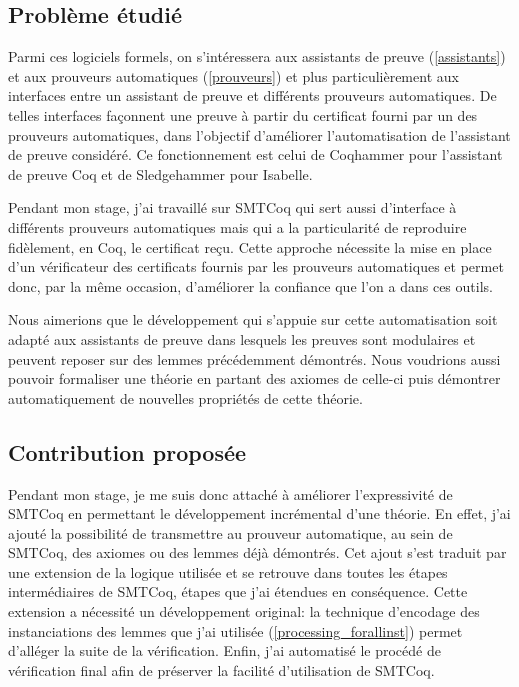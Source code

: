\documentclass[11pt]{article}
\begin{document}
\subsection{Problème étudié}

Parmi ces logiciels formels, on s'intéressera aux assistants de preuve (\ref{assistants}) et aux prouveurs automatiques (\ref{prouveurs}) et plus particulièrement aux interfaces entre un assistant de preuve et différents prouveurs automatiques. De telles interfaces façonnent une preuve à partir du certificat fourni par un des prouveurs automatiques, dans l'objectif d'améliorer l'automatisation de l'assistant de preuve considéré. Ce fonctionnement est celui de Coqhammer \cite{coqhammer} pour l'assistant de preuve Coq et de Sledgehammer \cite{sledgehammer_manual} pour Isabelle. \medbreak

Pendant mon stage, j'ai travaillé sur SMTCoq \cite{smtcoq_code, these_keller} qui sert aussi d'interface à différents prouveurs automatiques mais qui a la particularité de reproduire fidèlement, en Coq, le certificat reçu. Cette approche nécessite la mise en place d'un vérificateur des certificats fournis par les prouveurs automatiques et permet donc, par la même occasion, d'améliorer la confiance que l'on a dans ces outils.\medbreak

Nous aimerions que le développement qui s'appuie sur cette automatisation soit adapté aux assistants de preuve dans lesquels les preuves sont modulaires et peuvent reposer sur des lemmes précédemment démontrés. Nous voudrions aussi pouvoir formaliser une théorie en partant des axiomes de celle-ci puis démontrer automatiquement de nouvelles propriétés de cette théorie.

\subsection{Contribution proposée}

Pendant mon stage, je me suis donc attaché à améliorer l'expressivité de SMTCoq en permettant le développement incrémental d'une théorie. En effet, j'ai ajouté la possibilité de transmettre au prouveur automatique, au sein de SMTCoq, des axiomes ou des lemmes déjà démontrés. Cet ajout s'est traduit par une extension de la logique utilisée et se retrouve dans toutes les étapes intermédiaires de SMTCoq, étapes que j'ai étendues en conséquence. Cette extension a nécessité un développement original: la technique d'encodage des instanciations des lemmes que j'ai utilisée (\ref{processing_forallinst}) permet d'alléger la suite de la vérification. Enfin, j'ai automatisé le procédé de vérification final afin de préserver la facilité d'utilisation de SMTCoq.
\end{document}
